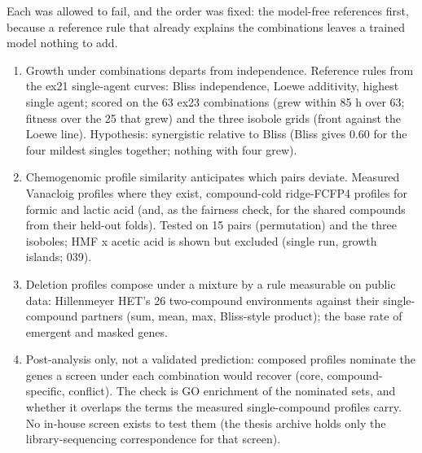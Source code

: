 \begin{table}[htbp]
\centering
\footnotesize
\caption[]{The five Bioscreen C runs of 2021, as the served records carry them. Length is
the longest well duration in the run, so a combination that never grew is a statement
about that length and no longer. Growth is the served raw-curve call of
Section~\ref{sec:data}. The isobole runs carry two biological replicates per dose cell
rather than three.}
\label{tab:runs}

\end{table}

 Each was allowed to fail, and the order was
fixed: the model-free references first, because a reference rule that already explains
the combinations leaves a trained model nothing to add.

\begin{enumerate}[leftmargin=1.4em,itemsep=2pt]
\item Growth under combinations departs from independence. Reference rules from the ex21
  single-agent curves: Bliss independence, Loewe additivity, highest single agent;
  scored on the 63 ex23 combinations (grew within 85 h over 63; fitness over the 25 that
  grew) and the three isobole grids (front against the Loewe line). Hypothesis:
  synergistic relative to Bliss (Bliss gives 0.60 for the four mildest singles together;
  nothing with four grew).
\item Chemogenomic profile similarity anticipates which pairs deviate. Measured
  Vanacloig profiles where they exist, compound-cold ridge-FCFP4 profiles for formic and
  lactic acid (and, as the fairness check, for the shared compounds from their held-out
  folds). Tested on 15 pairs (permutation) and the three isoboles; HMF x acetic acid is
  shown but excluded (single run, growth islands; 039).
\item Deletion profiles compose under a mixture by a rule measurable on public data:
  Hillenmeyer HET's 26 two-compound environments against their single-compound partners
  (sum, mean, max, Bliss-style product); the base rate of emergent and masked genes.
\item Post-analysis only, not a validated prediction: composed profiles nominate the
  genes a screen under each combination would recover (core, compound-specific,
  conflict). The check is GO enrichment of the nominated sets, and whether it overlaps
  the terms the measured single-compound profiles carry. No in-house screen exists to
  test them (the thesis archive holds only the library-sequencing correspondence for
  that screen).
\end{enumerate}

